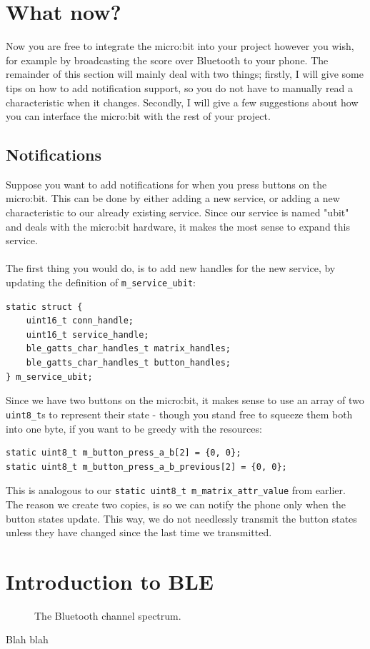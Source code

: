 \documentclass[11pt,a4paper]{article}
\begin{document}
\section{What now?}
Now you are free to integrate the micro:bit into your project however you wish, for example by broadcasting the score over Bluetooth to your phone. The remainder of this section will mainly deal with two things; firstly, I will give some tips on how to add notification support, so you do not have to manually read a characteristic when it changes. Secondly, I will give a few suggestions about how you can interface the micro:bit with the rest of your project.

\subsection{Notifications}
Suppose you want to add notifications for when you press buttons on the micro:bit. This can be done by either adding a new service, or adding a new characteristic to our already existing service. Since our service is named "ubit" and deals with the micro:bit hardware, it makes the most sense to expand this service.\\
\\
The first thing you would do, is to add new handles for the new service, by updating the definition of \texttt{m_service_ubit}:
\begin{verbatim}
static struct {
	uint16_t conn_handle;
	uint16_t service_handle;
	ble_gatts_char_handles_t matrix_handles;
	ble_gatts_char_handles_t button_handles;
} m_service_ubit;
\end{verbatim}
Since we have two buttons on the micro:bit, it makes sense to use an array of two \texttt{uint8_t}s to represent their state - though you stand free to squeeze them both into one byte, if you want to be greedy with the resources:
\begin{verbatim}
static uint8_t m_button_press_a_b[2] = {0, 0};
static uint8_t m_button_press_a_b_previous[2] = {0, 0};
\end{verbatim}
This is analogous to our \texttt{static uint8_t m_matrix_attr_value} from earlier. The reason we create two copies, is so we can notify the phone only when the button states update. This way, we do not needlessly transmit the button states unless they have changed since the last time we transmitted.

\newpage
\noindent
\appendix
\section{Introduction to BLE}
\label{app::intro_ble}
\begin{figure}
\centering
\resizebox{\linewidth}{!}{

}
\caption{The Bluetooth channel spectrum.}
\label{fig::bluetooth_spectrum}
\end{figure}
Blah blah
\end{document}
